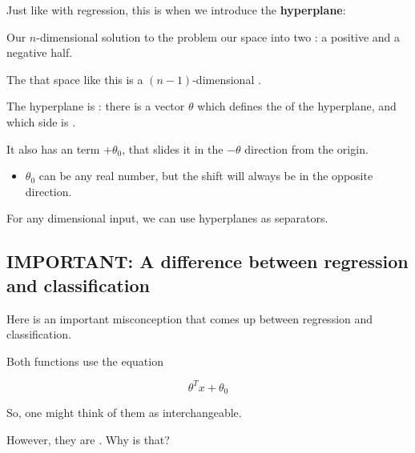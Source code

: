         Just like with regression, this is when we introduce the \textbf{hyperplane}:\\
        
        \begin{concept}
            Our $n$-dimensional  solution to the  problem  our space into two : a positive and a negative half.
            
            The  that  space like this is a $(n-1)$-dimensional .
            
            The hyperplane is : there is a  vector $\theta$ which defines the  of the hyperplane, and which side is .
            
            It also has an  term $+\theta_0$, that slides it in the $-\theta$ direction  from the origin.

            \subsecdiv

            \begin{itemize}
                \item $\theta_0$ can be any real number, but the shift will always be in the opposite direction.
            \end{itemize}
        \end{concept}
        
        For any dimensional input, we can use hyperplanes as separators.
        
    
    \subsection{IMPORTANT: A difference between regression and classification}
    
        Here is an important misconception that comes up between regression and classification.
        
        Both functions use the equation
        
        \begin{equation}
            \theta^T x + \theta_0
        \end{equation}
        
        So, one might think of them as interchangeable.
        
        However, they are . Why is that?
        
